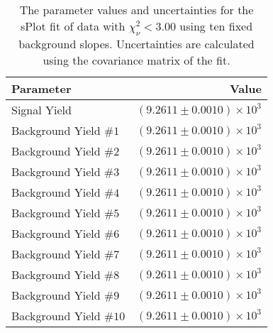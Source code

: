 
\begin{table}[ht]
    \begin{center}
        \begin{tabular}{lr}\toprule
            Parameter & Value \\\midrule
            Signal Yield & $(9.2611 \pm 0.0010) \times 10^{3}$ \\
            Background Yield $\#1$ & $(9.2611 \pm 0.0010) \times 10^{3}$ \\
            Background Yield $\#2$ & $(9.2611 \pm 0.0010) \times 10^{3}$ \\
            Background Yield $\#3$ & $(9.2611 \pm 0.0010) \times 10^{3}$ \\
            Background Yield $\#4$ & $(9.2611 \pm 0.0010) \times 10^{3}$ \\
            Background Yield $\#5$ & $(9.2611 \pm 0.0010) \times 10^{3}$ \\
            Background Yield $\#6$ & $(9.2611 \pm 0.0010) \times 10^{3}$ \\
            Background Yield $\#7$ & $(9.2611 \pm 0.0010) \times 10^{3}$ \\
            Background Yield $\#8$ & $(9.2611 \pm 0.0010) \times 10^{3}$ \\
            Background Yield $\#9$ & $(9.2611 \pm 0.0010) \times 10^{3}$ \\
            Background Yield $\#10$ & $(9.2611 \pm 0.0010) \times 10^{3}$ \\\bottomrule
        \end{tabular}
        \caption{The parameter values and uncertainties for the sPlot fit of data with $\chi^2_\nu < 3.00$ using ten fixed background slopes. Uncertainties are calculated using the covariance matrix of the fit.}\label{tab:splot-fit-results-chisqdof-3.00-fixed-10}
    \end{center}
\end{table}
